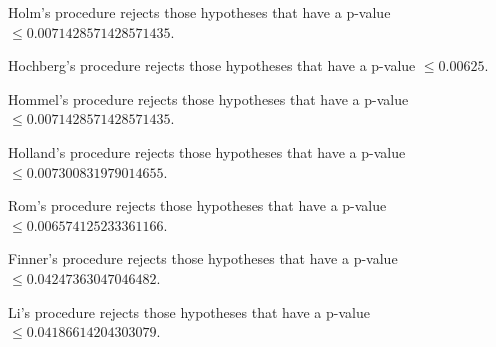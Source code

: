 \documentclass[a4paper,10pt]{article}
\begin{document}
\begin{landscape}
Holm's procedure rejects those hypotheses that have a p-value $\le0.0071428571428571435$.


Hochberg's procedure rejects those hypotheses that have a p-value $\le0.00625$.


Hommel's procedure rejects those hypotheses that have a p-value $\le0.0071428571428571435$.


Holland's procedure rejects those hypotheses that have a p-value $\le0.007300831979014655$.


Rom's procedure rejects those hypotheses that have a p-value $\le0.006574125233361166$.


Finner's procedure rejects those hypotheses that have a p-value $\le0.04247363047046482$.


Li's procedure rejects those hypotheses that have a p-value $\le0.04186614204303079$.



\newpage


\end{landscape}
\end{document}
